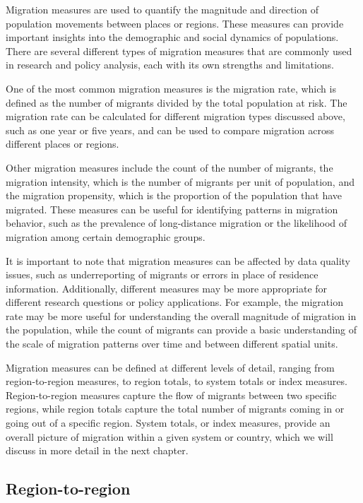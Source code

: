 \documentclass[
]{book}
\begin{document}
Migration measures are used to quantify the magnitude and direction of population movements between places or regions. These measures can provide important insights into the demographic and social dynamics of populations. There are several different types of migration measures that are commonly used in research and policy analysis, each with its own strengths and limitations.

One of the most common migration measures is the migration rate, which is defined as the number of migrants divided by the total population at risk. The migration rate can be calculated for different migration types discussed above, such as one year or five years, and can be used to compare migration across different places or regions.

Other migration measures include the count of the number of migrants, the migration intensity, which is the number of migrants per unit of population, and the migration propensity, which is the proportion of the population that have migrated. These measures can be useful for identifying patterns in migration behavior, such as the prevalence of long-distance migration or the likelihood of migration among certain demographic groups.

It is important to note that migration measures can be affected by data quality issues, such as underreporting of migrants or errors in place of residence information. Additionally, different measures may be more appropriate for different research questions or policy applications. For example, the migration rate may be more useful for understanding the overall magnitude of migration in the population, while the count of migrants can provide a basic understanding of the scale of migration patterns over time and between different spatial units.

Migration measures can be defined at different levels of detail, ranging from region-to-region measures, to region totals, to system totals or index measures. Region-to-region measures capture the flow of migrants between two specific regions, while region totals capture the total number of migrants coming in or going out of a specific region. System totals, or index measures, provide an overall picture of migration within a given system or country, which we will discuss in more detail in the next chapter.

\hypertarget{region-to-region}{%
\subsection{Region-to-region}\label{region-to-region}}
\end{document}
